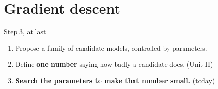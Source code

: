 \documentclass[aspectratio=169]{beamer}
\begin{document}
\section[GD]{Gradient descent}
\label{sec:gd}

\begin{frame}{Step 3, at last}
  \begin{enumerate}
    \item<1-> Propose a family of candidate models, controlled by parameters.
    \item<2-> Define \textbf{one number} saying how badly a candidate does.
      \hfill{\small\color{gray}(Unit II)}
    \item<3-> \textbf{Search the parameters to make that number small.}
      \hfill{\small\color{gray}(today)}
  \end{enumerate}
  \vspace{0.8em}
  \vspace{0.3em}
\end{frame}
\end{document}

